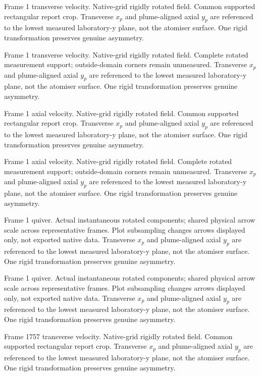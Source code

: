 \caption{Frame 1 transverse velocity. Native-grid rigidly rotated field. Common supported rectangular report crop. Transverse $x_p$ and plume-aligned axial $y_p$ are referenced to the lowest measured laboratory-y plane, not the atomiser surface. One rigid transformation preserves genuine asymmetry.}

\caption{Frame 1 transverse velocity. Native-grid rigidly rotated field. Complete rotated measurement support; outside-domain corners remain unmeasured. Transverse $x_p$ and plume-aligned axial $y_p$ are referenced to the lowest measured laboratory-y plane, not the atomiser surface. One rigid transformation preserves genuine asymmetry.}

\caption{Frame 1 axial velocity. Native-grid rigidly rotated field. Common supported rectangular report crop. Transverse $x_p$ and plume-aligned axial $y_p$ are referenced to the lowest measured laboratory-y plane, not the atomiser surface. One rigid transformation preserves genuine asymmetry.}

\caption{Frame 1 axial velocity. Native-grid rigidly rotated field. Complete rotated measurement support; outside-domain corners remain unmeasured. Transverse $x_p$ and plume-aligned axial $y_p$ are referenced to the lowest measured laboratory-y plane, not the atomiser surface. One rigid transformation preserves genuine asymmetry.}

\caption{Frame 1 quiver. Actual instantaneous rotated components; shared physical arrow scale across representative frames. Plot subsampling changes arrows displayed only, not exported native data. Transverse $x_p$ and plume-aligned axial $y_p$ are referenced to the lowest measured laboratory-y plane, not the atomiser surface. One rigid transformation preserves genuine asymmetry.}

\caption{Frame 1 quiver. Actual instantaneous rotated components; shared physical arrow scale across representative frames. Plot subsampling changes arrows displayed only, not exported native data. Transverse $x_p$ and plume-aligned axial $y_p$ are referenced to the lowest measured laboratory-y plane, not the atomiser surface. One rigid transformation preserves genuine asymmetry.}

\caption{Frame 1757 transverse velocity. Native-grid rigidly rotated field. Common supported rectangular report crop. Transverse $x_p$ and plume-aligned axial $y_p$ are referenced to the lowest measured laboratory-y plane, not the atomiser surface. One rigid transformation preserves genuine asymmetry.}

